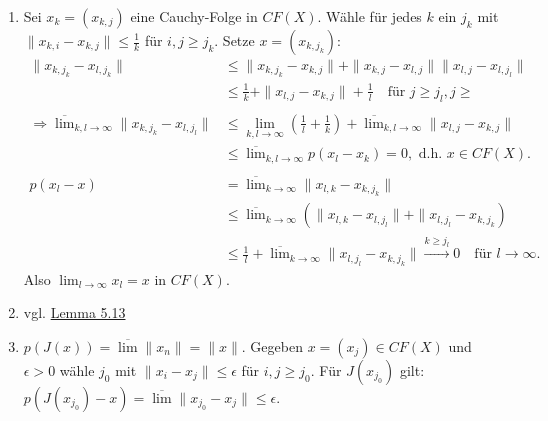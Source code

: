 \begin{beweis}
	\begin{enumerate}[label=\roman*\upshape)]
		\item Sei $x_{k} = (x_{k, j})$ eine Cauchy-Folge in $CF(X)$. Wähle für jedes $k$ ein $j_{k}$ mit $\| x_{k, i} - x_{k, j} \| \leq \frac{1}{k}$ für $i, j \geq j_{k}$. Setze $x = (x_{k, j_{k}})$:
			\begin{align*}
				\| x_{k, j_{k}} - x_{l, j_{k}} \| & \leq \| x_{k, j_{k}} - x_{k, j} \| + \| x_{k, j} - x_{l, j} \| \| x_{l, j} - x_{l, j_{l}} \| \\
				& \leq \frac{1}{k} + \| x_{l, j} - x_{k, j} \| + \frac{1}{l} \quad \text{für }j \geq j_{l}, j \geq \\ 
				~ \\
				\Rightarrow \overline{\lim}_{k, l \rightarrow \infty} \| x_{k, j_{k}} - x_{l, j_{l}} \| & \leq \lim_{k, l \rightarrow \infty} \left( \frac{1}{l} + \frac{1}{k} \right) + \overline{\lim}_{k, l \rightarrow \infty} \| x_{l, j} - x_{k, j} \| \\
				& \leq \overline{\lim}_{k, l \rightarrow \infty} p(x_{l} - x_{k}) = 0, \text{ d.h. } x \in CF(X). \\ 
				~ \\
				p(x_{l} - x) & = \overline{\lim}_{k \rightarrow \infty} \| x_{l, k} - x_{k, j_{k}} \| \\
				& \leq \overline{\lim}_{k \rightarrow \infty} \left( \| x_{l, k} - x_{l, j_{l}} \| + \| x_{l, j_{l}} - x_{k, j_{k}} \right) \\
				& \leq \frac{1}{l} + \overline{\lim}_{k \rightarrow \infty} \| x_{l, j_{l}} - x_{k, j_{k}} \| \xrightarrow[]{k \geq j_{l}} 0 \quad \text{für } l \rightarrow \infty.
			\end{align*}
			Also $\lim_{l \rightarrow \infty} x_{l} = x$ in $CF(X)$.
		\item vgl. \hyperref[lemma:5.13]{Lemma 5.13}
		\item $p(J(x)) = \overline{\lim} \| x_{n} \| = \| x \|$. Gegeben $x = (x_{j}) \in CF(X)$ und $\epsilon > 0$ wähle $j_{0}$ mit $\| x_{i} - x_{j} \| \leq \epsilon$ für $i, j \geq j_{0}$. Für $J(x_{j_{0}})$ gilt: $p(J(x_{j_{0}}) - x) = \overline{\lim} \| x_{j_{0}} - x_{j} \| \leq \epsilon$.
	\end{enumerate}	
\end{beweis}



\newpage